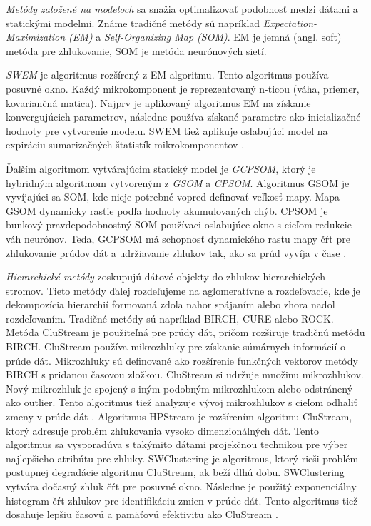 \textit{Metódy založené na modeloch} sa snažia optimalizovať podobnosť medzi dátami a statickými modelmi. Známe tradičné metódy sú napríklad \textit{Expectation-Maximization (EM)} a \textit{Self-Organizing Map (SOM)}. EM je jemná (angl. soft) metóda pre zhlukovanie, SOM je metóda neurónových sietí.
\par
\textit{SWEM} je algoritmus rozšírený z EM algoritmu. Tento algoritmus používa posuvné okno. Každý mikrokomponent je reprezentovaný n-ticou (váha, priemer, kovariančná matica). Najprv je aplikovaný algoritmus EM na získanie konvergujúcich parametrov, následne používa získané parametre ako inicializačné hodnoty pre vytvorenie modelu. SWEM tiež aplikuje oslabujúci model na expiráciu sumarizačných štatistík mikrokomponentov \citep{nguyen2015survey}.
\par
Ďalším algoritmom vytvárajúcim statický model je \textit{GCPSOM}, ktorý je hybridným algoritmom vytvoreným z \textit{GSOM} a \textit{CPSOM}. Algoritmus GSOM je vyvíjajúci sa SOM, kde nieje potrebné vopred definovať veľkosť mapy. Mapa GSOM dynamicky rastie podľa hodnoty akumulovaných chýb. CPSOM je bunkový pravdepodobnostný SOM používaci oslabujúce okno s cieľom redukcie váh neurónov. Teda, GCPSOM má schopnosť dynamického rastu mapy čŕt pre zhlukovanie prúdov dát a udržiavanie zhlukov tak, ako sa prúd vyvíja v čase \citep{nguyen2015survey}.

\textit{Hierarchické metódy} zoskupujú dátové objekty do zhlukov hierarchických stromov. Tieto metódy ďalej rozdeľujeme na aglomeratívne a rozdeľovacie, kde je dekompozícia hierarchií formovaná zdola nahor spájaním alebo zhora nadol rozdeľovaním. Tradičné metódy sú napríklad BIRCH, CURE alebo  ROCK. Metóda CluStream je použiteľná pre prúdy dát, pričom rozširuje tradičnú metódu BIRCH. CluStream používa mikrozhluky pre získanie súmárnych informácií o prúde dát. Mikrozhluky sú definované ako rozšírenie funkčných vektorov metódy BIRCH s pridanou časovou zložkou. CluStream si udržuje množinu mikrozhlukov. Nový mikrozhluk je spojený s iným podobným mikrozhlukom alebo odstránený ako outlier. Tento algoritmus tiež analyzuje vývoj mikrozhlukov s cieľom odhaliť zmeny v prúde dát \citep{nguyen2015survey}. Algoritmus HPStream je rozšírením algoritmu CluStream, ktorý adresuje problém zhlukovania vysoko dimenzionálných dát. Tento algoritmus sa vysporadúva s takýmito dátami projekčnou technikou pre výber najlepšieho atribútu pre zhluky. SWClustering je algoritmus, ktorý rieši problém postupnej degradácie algoritmu CluStream, ak beží dlhú dobu. SWClustering vytvára dočasný zhluk čŕt pre posuvné okno. Následne je použitý exponenciálny histogram čŕt zhlukov pre identifikáciu zmien v prúde dát. Tento algoritmus tiež dosahuje lepšiu časovú a pamäťovú efektivitu ako CluStream \citep{han2011data}.

